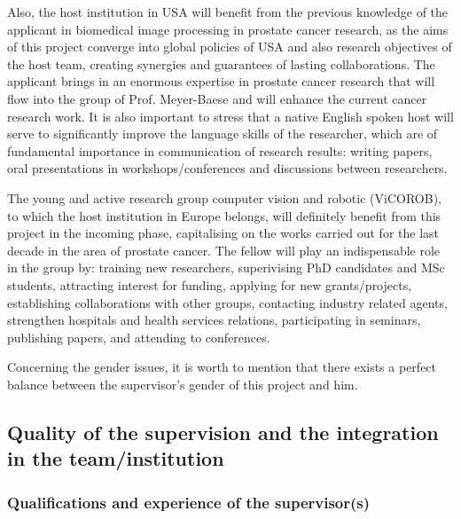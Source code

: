 Also, the host institution in USA will benefit from the previous knowledge of the applicant in biomedical image processing in prostate cancer research, as the aims of this project converge into global policies of USA and also research objectives of the host team, creating synergies and guarantees of lasting collaborations. The applicant brings in an enormous expertise in prostate cancer research that will flow into the group of Prof. Meyer-Baese and will enhance the current cancer research work. It is also important to stress that a native English spoken host will serve to significantly improve the language skills of the researcher, which are of fundamental importance in communication of research results: writing papers, oral presentations in workshops/conferences and discussions between researchers.

The young and active research group computer vision and robotic (ViCOROB), to which the host institution in Europe belongs, will definitely benefit from this project in the incoming phase, capitalising on the works carried out for the last decade in the area of prostate cancer. The fellow will play an indispensable role in the group by: training new researchers, superivising PhD candidates and MSc students, attracting interest for funding, applying for new grants/projects,  establishing collaborations with other groups, contacting industry related agents, strengthen hospitals and health services relations, participating in seminars, publishing papers, and attending to conferences.

Concerning the gender issues, it is worth to mention that there exists a perfect balance between the supervisor's gender of this project and him.

\subsection{Quality of the supervision and the integration in the team/institution}
\label{sec:supervision}

\subsubsection*{Qualifications and experience of the supervisor(s)}

